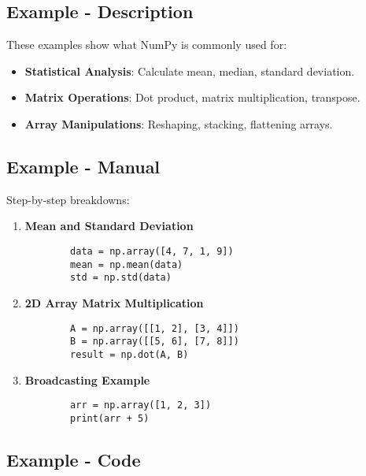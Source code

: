 \subsection{Example - Description}
These examples show what NumPy is commonly used for:

\begin{itemize}
	\item \textbf{Statistical Analysis}: Calculate mean, median, standard deviation.
	\item \textbf{Matrix Operations}: Dot product, matrix multiplication, transpose.
	\item \textbf{Array Manipulations}: Reshaping, stacking, flattening arrays.
\end{itemize}

\subsection{Example - Manual}
Step-by-step breakdowns:

\begin{enumerate}
	\item \textbf{Mean and Standard Deviation}
	\begin{framed}
	\begin{verbatim}
		data = np.array([4, 7, 1, 9])
		mean = np.mean(data)
		std = np.std(data)
	\end{verbatim}
\end{framed}

	
	\item \textbf{2D Array Matrix Multiplication}
	\begin{framed}
	\begin{verbatim}
		A = np.array([[1, 2], [3, 4]])
		B = np.array([[5, 6], [7, 8]])
		result = np.dot(A, B)
	\end{verbatim}
\end{framed}
	
	\item \textbf{Broadcasting Example}
	\begin{framed}
	\begin{verbatim}
		arr = np.array([1, 2, 3])
		print(arr + 5)
	\end{verbatim}
\end{framed}
\end{enumerate}


\subsection{Example - Code}

